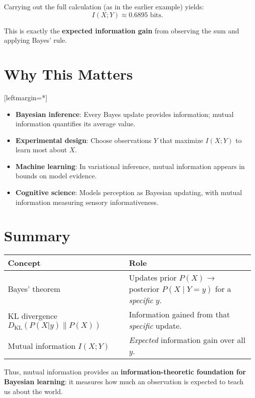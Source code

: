 \documentclass{article}
\begin{document}
Carrying out the full calculation (as in the earlier example) yields:
\[
I(X;Y) \approx 0.6895 \text{ bits}.
\]

This is exactly the \textbf{expected information gain} from observing the sum and applying Bayes' rule.

\section*{Why This Matters}

[leftmargin=*]\begin{itemize}
    \item \textbf{Bayesian inference}: Every Bayes update provides information; mutual information quantifies its average value.
    \item \textbf{Experimental design}: Choose observations \(Y\) that maximize \(I(X;Y)\) to learn most about \(X\).
    \item \textbf{Machine learning}: In variational inference, mutual information appears in bounds on model evidence.
    \item \textbf{Cognitive science}: Models perception as Bayesian updating, with mutual information measuring sensory informativeness.
\end{itemize}

\section*{Summary}

\begin{center}
\begin{tabular}{ll}
\toprule
Concept & Role \\
\midrule
Bayes' theorem & Updates prior \(P(X)\) → posterior \(P(X \mid Y = y)\) for a \emph{specific} \(y\). \\
KL divergence \(D_{\mathrm{KL}}(P(X|y) \| P(X))\) & Information gained from that \emph{specific} update. \\
Mutual information \(I(X;Y)\) & \emph{Expected} information gain over all \(y\). \\
\bottomrule
\end{tabular}
\end{center}

Thus, mutual information provides an \textbf{information-theoretic foundation for Bayesian learning}: it measures how much an observation is expected to teach us about the world.
\end{document}

